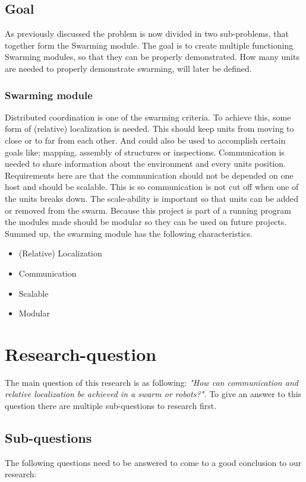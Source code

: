 \documentclass[10pt,a4paper]{article}
\begin{document}
\subsection{Goal}
As previously discussed the problem is now divided in two sub-problems, that together form the Swarming module. The goal is to create multiple functioning Swarming modules, so that they can be properly demonstrated. How many units are needed to properly demonstrate swarming, will later be defined.


\subsubsection{Swarming module}
Distributed coordination is one of the swarming criteria. To achieve this, some form of (relative) localization is needed. This should keep units from moving to close or to far from each other. And could also be used to accomplish certain goals like;  mapping, assembly of structures or inspections. Communication is needed to share information about the environment and every units position. Requirements here are that the communication should not be depended on one host and should be scalable. This is so communication is not cut off when one of the units breaks down. The scale-ability is important so that units can be added or removed from the swarm. Because this project is part of a running program the modules made should be modular so they can be used on future projects. Summed up, the swarming module has the following characteristics.

\begin{itemize}
\item (Relative) Localization
\item Communication
\item Scalable
\item Modular
\end{itemize}

\section{Research-question}

The main question of this research is as following: \textit{"How can communication and relative localization be achieved in a swarm or robots?".} To give an answer to this question there are multiple sub-questions to research first. 
 


\subsection{Sub-questions} 
The following questions need to be answered to come to a good conclusion to our research:
\end{document}
